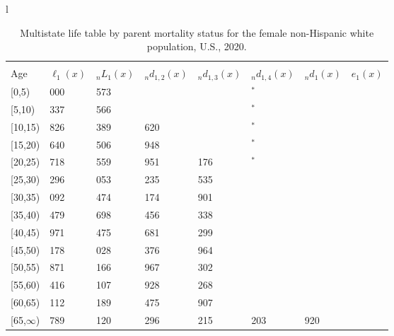 \documentclass[
]{article}
\begin{document}
\begin{table}
\caption{\label{tab:table-nhwhite-female}Multistate life table by parent mortality status for the female non-Hispanic white population, U.S., 2020.}

\centering
\fontsize{9}{11}\selectfont
\begin{tabular}[t]{l}
\hline
\begin{tabular}{>{\raggedright\arraybackslash}p{.45in}>{\raggedleft\arraybackslash}p{.65in}>{\raggedleft\arraybackslash}p{.65in}>{\raggedleft\arraybackslash}p{.65in}>{\raggedleft\arraybackslash}p{.65in}>{\raggedleft\arraybackslash}p{.65in}>{\raggedleft\arraybackslash}p{.65in}>{\raggedleft\arraybackslash}p{.65in}}
\toprule
\multicolumn{1}{c}{ } & \multicolumn{7}{c}{(1) Lost neither} \\
\cmidrule(l{3pt}r{3pt}){2-8}
Age & $\ell_{1}(x)$ & ${}_nL_{1}(x)$ & ${}_nd_{1,2}(x)$ & ${}_nd_{1,3}(x)$ & ${}_nd_{1,4}(x)$ & ${}_nd_{1}(x)$ & $e_{1}(x)$\\
\midrule
{}[0,5) & 100 000 & 495 573 & 798 & 350 & 55$^{*}$ & 460 & 44\\
{}[5,10) & 98 337 & 488 566 & 977 & 494 & 3$^{*}$ & 37 & 39\\
{}[10,15) & 96 826 & 479 389 & 1 620 & 495 & 21$^{*}$ & 50 & 34\\
{}[15,20) & 94 640 & 466 506 & 1 948 & 823 & 14$^{*}$ & 136 & 29\\
{}[20,25) & 91 718 & 446 559 & 2 951 & 1 176 & 57$^{*}$ & 238 & 25\\
\addlinespace
{}[25,30) & 87 296 & 421 053 & 3 235 & 1 535 & 87 & 346 & 20\\
{}[30,35) & 82 092 & 387 474 & 4 174 & 1 901 & 95 & 443 & 16\\
{}[35,40) & 75 479 & 345 698 & 5 456 & 2 338 & 183 & 531 & 12\\
{}[40,45) & 66 971 & 290 475 & 6 681 & 3 299 & 238 & 574 & 9\\
{}[45,50) & 56 178 & 228 028 & 7 376 & 2 964 & 324 & 642 & 6\\
\addlinespace
{}[50,55) & 44 871 & 159 166 & 7 967 & 3 302 & 537 & 650 & 4\\
{}[55,60) & 32 416 & 96 107 & 6 928 & 3 268 & 523 & 585 & 2\\
{}[60,65) & 21 112 & 43 189 & 4 475 & 1 907 & 560 & 382 & 1\\
{}[65,$\infty$) & 13 789 & 38 120 & 4 296 & 2 215 & 1 203 & 1 920 & 0\\
\end{tabular}\\

\end{tabular}
\end{table}
\end{document}
